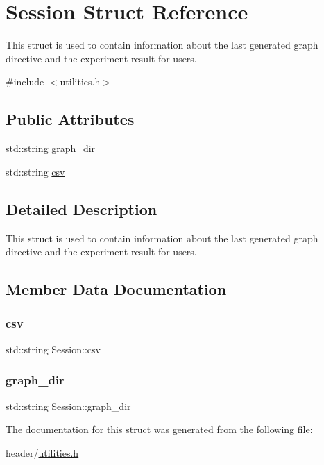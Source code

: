 \hypertarget{struct_session}{}\section{Session Struct Reference}
\label{struct_session}


This struct is used to contain information about the last generated graph directive and the experiment result for users.  




{\ttfamily \#include $<$utilities.\+h$>$}

\subsection*{Public Attributes}
\begin{DoxyCompactItemize}
\item 
std\+::string \hyperlink{struct_session_aecaa42a56f197e0874041533ccb358a6}{graph\+\_\+dir}
\item 
std\+::string \hyperlink{struct_session_a256b14530b834d61ce85bab451694b8c}{csv}
\end{DoxyCompactItemize}


\subsection{Detailed Description}
This struct is used to contain information about the last generated graph directive and the experiment result for users. 

\subsection{Member Data Documentation}
\mbox{\label{struct_session_a256b14530b834d61ce85bab451694b8c}} 
\subsubsection{\texorpdfstring{csv}{csv}}
{\footnotesize\ttfamily std\+::string Session\+::csv}

\mbox{\label{struct_session_aecaa42a56f197e0874041533ccb358a6}} 
\subsubsection{\texorpdfstring{graph\+\_\+dir}{graph\_dir}}
{\footnotesize\ttfamily std\+::string Session\+::graph\+\_\+dir}



The documentation for this struct was generated from the following file\+:\begin{DoxyCompactItemize}
\item 
header/\hyperlink{utilities_8h}{utilities.\+h}\end{DoxyCompactItemize}
